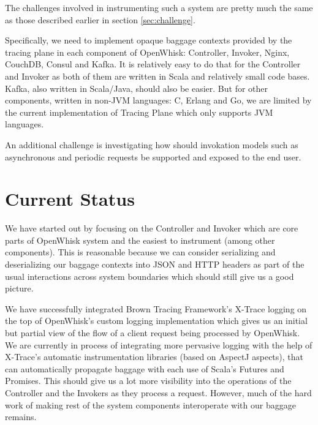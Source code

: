 The challenges involved in instrumenting such a system are pretty much the same as those described earlier in section \ref{sec:challenge}.

Specifically, we need to implement opaque baggage contexts provided by the tracing plane in each component of OpenWhisk: Controller, Invoker, Nginx, CouchDB, Consul and Kafka. It is relatively easy to do that for the Controller and Invoker as both of them are written in Scala and relatively small code bases. Kafka, also written in Scala/Java, should also be easier. But for other components, written in non-JVM languages: C, Erlang and Go, we are limited by the current implementation of Tracing Plane which only supports JVM languages.

An additional challenge is investigating how should invokation models such as asynchronous and periodic requests be supported and exposed to the end user.

\section{Current Status}
We have started out by focusing on the Controller and Invoker which are core parts of OpenWhisk system and the easiest to instrument (among other components). This is reasonable because we can consider serializing and deserializing our baggage contexts into JSON and HTTP headers as part of the usual interactions across system boundaries which should still give us a good picture.

We have successfully integrated\cite{web:instru} Brown Tracing Framework's\cite{web:btf} X-Trace logging on the top of OpenWhisk's custom logging implementation which gives us an initial but partial view of the flow of a client request being processed by OpenWhisk. We are currently in process of integrating more pervasive logging with the help of X-Trace's automatic instrumentation libraries (based on AspectJ aspects), that can automatically propagate baggage with each use of Scala's Futures and Promises. This should give us a lot more visibility into the operations of the Controller and the Invokers as they process a request. However, much of the hard work of making rest of the system components interoperate with our baggage remains.
